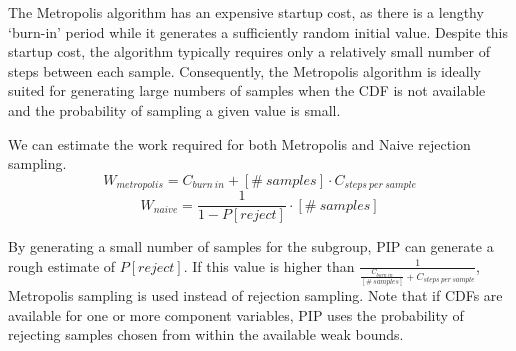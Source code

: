 The Metropolis algorithm has an  expensive startup cost, as there is a
lengthy  `burn-in' period  while  it generates  a sufficiently  random
initial  value.  Despite  this startup  cost, the  algorithm typically
requires only a relatively small  number of steps between each sample.
Consequently,   the  Metropolis  algorithm   is  ideally   suited  for
generating large numbers of samples  when the CDF is not available and
the probability of sampling a given value is small.

We can estimate the work required for both Metropolis and Naive rejection sampling.
$$W_{metropolis} = C_{burn\ in} + [\#\ samples] \cdot C_{steps\ per\ sample}$$
$$W_{naive} = \frac{1}{1-P[reject]} \cdot [\#\ samples]$$

By generating a small number of samples for the subgroup, PIP can generate a rough estimate of $P[reject]$.  If this value is higher than $\frac{1}{\frac{C_{burn\ in}}{[\#\ samples]} + C_{steps\ per\ sample}}$, Metropolis sampling is used instead of rejection sampling.  Note that if CDFs are available for one or more component variables, PIP uses the probability of rejecting samples chosen from within the available weak bounds.


%
%
%



